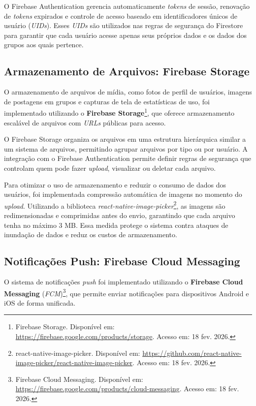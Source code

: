 O Firebase Authentication gerencia automaticamente \textit{tokens} de sessão, renovação de \textit{tokens} expirados e controle de acesso baseado em identificadores únicos de usuário (\textit{UIDs}). Esses \textit{UIDs} são utilizados nas regras de segurança do Firestore para garantir que cada usuário acesse apenas seus próprios dados e os dados dos grupos aos quais pertence.

\subsection{Armazenamento de Arquivos: Firebase Storage}

O armazenamento de arquivos de mídia, como fotos de perfil de usuários, imagens de postagens em grupos e capturas de tela de estatísticas de uso, foi implementado utilizando o \textbf{Firebase Storage}\footnote{Firebase Storage. Disponível em: \url{https://firebase.google.com/products/storage}. Acesso em: 18 fev. 2026.}, que oferece armazenamento escalável de arquivos com \textit{URLs} públicas para acesso.

O Firebase Storage organiza os arquivos em uma estrutura hierárquica similar a um sistema de arquivos, permitindo agrupar arquivos por tipo ou por usuário. A integração com o Firebase Authentication permite definir regras de segurança que controlam quem pode fazer \textit{upload}, visualizar ou deletar cada arquivo.

Para otimizar o uso de armazenamento e reduzir o consumo de dados dos usuários, foi implementada compressão automática de imagens no momento do \textit{upload}. Utilizando a biblioteca \textit{react-native-image-picker}\footnote{react-native-image-picker. Disponível em: \url{https://github.com/react-native-image-picker/react-native-image-picker}. Acesso em: 18 fev. 2026.}, as imagens são redimensionadas e comprimidas antes do envio, garantindo que cada arquivo tenha no máximo 3 MB. Essa medida protege o sistema contra ataques de inundação de dados e reduz os custos de armazenamento.

\subsection{Notificações Push: Firebase Cloud Messaging}

O sistema de notificações \textit{push} foi implementado utilizando o \textbf{Firebase Cloud Messaging} (\textit{FCM})\footnote{Firebase Cloud Messaging. Disponível em: \url{https://firebase.google.com/products/cloud-messaging}. Acesso em: 18 fev. 2026.}, que permite enviar notificações para dispositivos Android e iOS de forma unificada.

